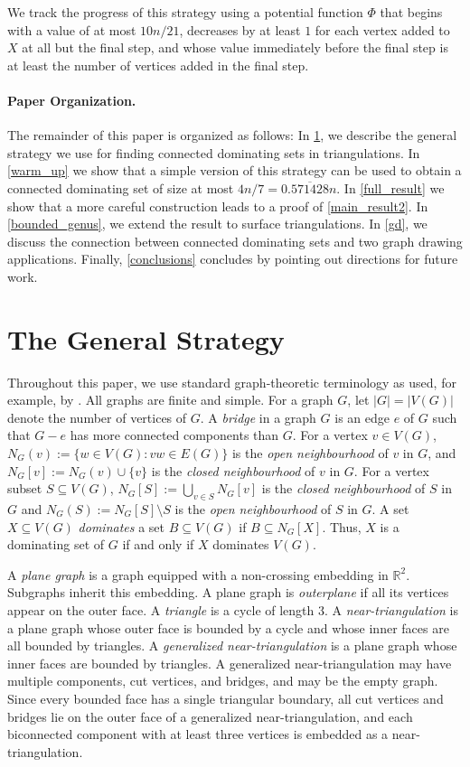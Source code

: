 \documentclass{patmorin}
\newcommand{\defin}[1]{\emph{\textcolor{brightmaroon}{#1}}}
\begin{document}
We track the progress of this strategy using a potential function $\Phi$ that begins with a value of at most $10n/21$, decreases by at least $1$ for each vertex added to $X$ at all but the final step, and whose value immediately before the final step is at least the number of vertices added in the final step.

\paragraph{Paper Organization.}
The remainder of this paper is organized as follows:  In \cref{strategy}, we describe the general strategy we use for finding connected dominating sets in triangulations.  In \cref{warm_up} we show that a simple version of this strategy can be used to obtain a connected dominating set of size at most $4n/7= 0.\overline{571428}n$. In \cref{full_result} we show that a more careful construction leads to a proof of \cref{main_result2}. In \cref{bounded_genus}, we extend the result to surface triangulations. In \cref{gd}, we discuss the connection between connected dominating sets and two graph drawing applications. Finally, \cref{conclusions} concludes by pointing out directions for future work.

\section{The General Strategy}
\label{strategy}

Throughout this paper, we use standard graph-theoretic terminology as used, for example, by \cite{diestel:graph}. All graphs are finite and simple.
For a graph $G$, let $|G|=|V(G)|$ denote the number of vertices of $G$.  A \defin{bridge} in a graph $G$ is an edge $e$ of $G$ such that $G-e$ has more connected components than $G$.  For a vertex $v\in V(G)$, $N_G(v):=\{w\in V(G):vw\in E(G)\}$ is the \defin{open neighbourhood} of $v$ in $G$, and $N_G[v]:=N_G(v)\cup\{v\}$ is the \defin{closed neighbourhood} of $v$ in $G$.  For a vertex subset $S\subseteq V(G)$, $N_G[S]:=\bigcup_{v\in S} N_{G}[v]$ is the \defin{closed neighbourhood} of $S$ in $G$ and $N_G(S):=N_G[S]\setminus S$ is the \defin{open neighbourhood} of $S$ in $G$.  A set $X\subseteq V(G)$ \defin{dominates} a set $B\subseteq V(G)$ if $B\subseteq N_G[X]$.  Thus, $X$ is a dominating set of $G$ if and only if $X$ dominates $V(G)$.

A \defin{plane graph} is a graph equipped with a non-crossing embedding in $\mathbb{R}^2$. Subgraphs inherit this embedding.  A plane graph is \defin{outerplane} if all its vertices appear on the outer face.  A \defin{triangle} is a cycle of length $3$. A \defin{near-triangulation} is a plane graph whose outer face is bounded by a cycle and whose inner faces are all bounded by triangles.  A \defin{generalized near-triangulation} is a plane graph whose inner faces are bounded by triangles. A generalized near-triangulation may have multiple components, cut vertices, and bridges, and may be the empty graph. Since every bounded face has a single triangular boundary, all cut vertices and bridges lie on the outer face of a generalized near-triangulation, and each biconnected component with at least three vertices is embedded as a near-triangulation.
\end{document}
